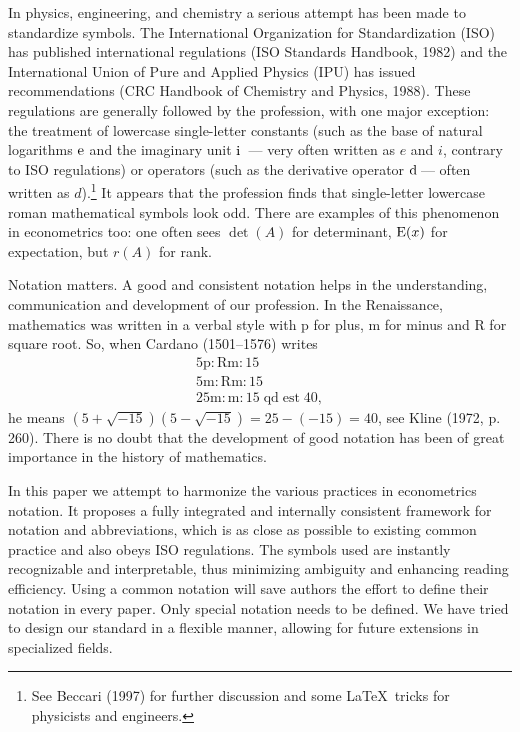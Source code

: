 \documentclass[11pt,dvips,a4paper]{article}
\begin{document}
In physics, engineering, and chemistry a serious attempt
has been made to standardize symbols.
The International Organization for Standardization (ISO) has published
international regulations (ISO Standards Handbook, 1982)
and the International Union of Pure and Applied Physics (IPU)
has issued recommendations (CRC Handbook of Chemistry and Physics, 1988).
These regulations are generally followed by the profession, with one major
exception: the treatment of lowercase single-letter constants
(such as the base of natural logarithms $\mathrm{e}$ and the imaginary unit
$\mathrm{i}$\ --- very often written as $e$ and $i$, contrary to ISO regulations)
or operators (such as the derivative operator $\rd$ --- often
written as $d$).\footnote{See Beccari (1997) for further discussion
and some \LaTeX\ tricks for physicists and engineers.}
It appears that the profession finds that single-letter lowercase roman
mathematical symbols look odd. There are examples of this
phenomenon in econometrics too: one often sees
$\det(A)$ for determinant, $\operatorname{E}(x)$ for expectation,
but $r(A)$ for rank.

Notation matters. A good and consistent notation helps in the
understanding, communication and development of our profession.
In the Renaissance, mathematics was written in a verbal style with
p for plus, m for minus and R for square root. So, when Cardano
(1501--1576) writes
\begin{gather*}
5\text{p}:\text{Rm}:15\\
5\text{m}:\text{Rm}:15\\
25\text{m}:\text{m}:15\;\text{qd}\;\text{est}\;40,
\end{gather*}
he means
$(5+\sqrt{-15})(5-\sqrt{-15})=25-(-15)=40$,
see Kline (1972, p. 260).
There is no doubt that the development of good notation has been
of great importance in the history of mathematics.

In this paper we attempt to harmonize the various practices in econometrics
notation. It proposes a fully integrated and internally consistent
framework for notation and abbreviations, which is as close as
possible to existing common practice and also obeys ISO regulations.
The symbols used are instantly recognizable and interpretable,
thus minimizing ambiguity and enhancing reading efficiency.
Using a common notation will save authors the effort to define
their notation in every paper.
Only special notation needs to be defined.
We have tried to design our standard in a flexible manner,
allowing for future extensions in specialized fields.
\end{document}
